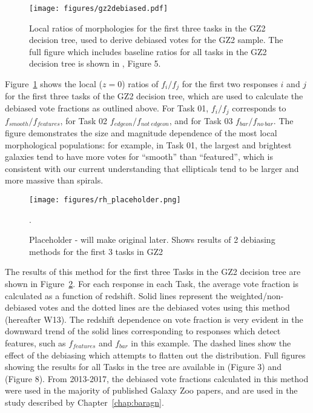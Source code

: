 \begin{figure}
\centering
\texttt{[image: figures/gz2debiased.pdf]}
\caption{Local ratios of morphologies for the first three tasks in the GZ2 decision tree, used to derive debiased votes for the GZ2 sample. The full figure which includes baseline ratios for all tasks in the GZ2 decision tree is shown in \citet{Willett2013}, Figure 5.}
\label{fig:gz2debiased}
\end{figure} 

Figure~\ref{fig:gz2debiased} shows the local ($z=0$) ratios of $f_i/f_j$ for the first two responses $i$ and $j$ for the first three tasks of the GZ2 decision tree, which are used to calculate the debiased vote fractions as outlined above. For Task 01, $f_i/f_j$ corresponds to $f_{smooth}/f_{features}$, for Task 02 $f_{edgeon}/f_{not~edgeon}$, and for Task 03 $f_{bar}/f_{no~bar}.$ The figure demonstrates the size and magnitude dependence of the most local morphological populations: for example, in Task 01, the largest and brightest galaxies tend to have more votes for ``smooth'' than ``featured'', which is consistent with our current understanding that ellipticals tend to be larger and more massive than spirals. 


\begin{figure}
\centering
\texttt{[image: figures/rh\_placeholder.png]}
\caption{Placeholder - will make original later. Shows results of 2 debiasing methods for the first 3 tasks in GZ2}. 
\label{fig:gz2debiasingresults}
\end{figure}

The results of this method for the first three Tasks in the GZ2 decision tree are shown in Figure~\ref{fig:gz2debiasingresults}. For each response in each Task, the average vote fraction is calculated as a function of redshift. Solid lines represent the weighted/non-debiased votes and the dotted lines are the debiased votes using this method (hereafter W13).
The redshift dependence on vote fraction is very evident in the downward trend of the solid lines corresponding to responses which detect features, such as $f_{features}$ and $f_{bar}$ in this example. The dashed lines show the effect of the debiasing which attempts to flatten out the distribution. Full figures showing the results for all Tasks in the tree are available in \citet{Willett2013} (Figure 3) and \citet{Hart2016} (Figure 8). From 2013-2017, the debiased vote fractions calculated in this method were used in the majority of published Galaxy Zoo papers, and are used in the study described by Chapter~\ref{chap:baragn}. 


